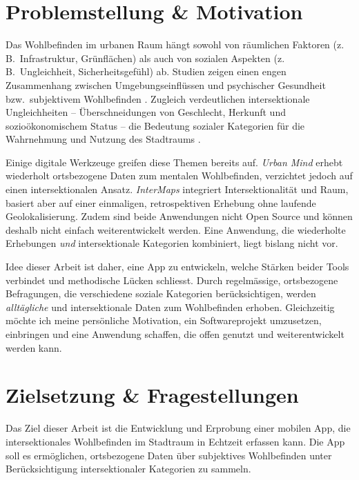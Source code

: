 \documentclass{template}
\begin{document}
\maketitle

\section{Problemstellung \& Motivation}
Das Wohlbefinden im urbanen Raum hängt sowohl von räumlichen Faktoren (z.\,B.\ Infrastruktur, Grünflächen) als auch von sozialen Aspekten (z.\,B.\ Ungleichheit, Sicherheitsgefühl) ab. Studien zeigen einen engen Zusammenhang zwischen Umgebungseinflüssen und psychischer Gesundheit bzw.\ subjektivem Wohlbefinden \parencite{kan_impacts_2022, hammoud_smartphone-based_2024, bergou_mental_2022}. Zugleich verdeutlichen intersektionale Ungleichheiten – Überschneidungen von Geschlecht, Herkunft und sozioökonomischem Status – die Bedeutung sozialer Kategorien für die Wahrnehmung und Nutzung des Stadtraums \parencite{webster_centering_2021, rodo-de-zarate_developing_2014, beebeejaun_race_2022}.

Einige digitale Werkzeuge greifen diese Themen bereits auf. \emph{Urban Mind} \parencite{bakolis_urban_2018} erhebt wiederholt ortsbezogene Daten zum mentalen Wohlbefinden, verzichtet jedoch auf einen intersektionalen Ansatz. \emph{InterMaps} \parencite{rodo-de-zarate_developing_2014} integriert Intersektionalität und Raum, basiert aber auf einer einmaligen, retrospektiven Erhebung ohne laufende Geolokalisierung. Zudem sind beide Anwendungen nicht Open Source und können deshalb nicht einfach weiterentwickelt werden. Eine Anwendung, die wiederholte Erhebungen \emph{und} intersektionale Kategorien kombiniert, liegt bislang nicht vor.

Idee dieser Arbeit ist daher, eine App zu entwickeln, welche Stärken beider Tools verbindet und methodische Lücken schliesst. Durch regelmässige, ortsbezogene Befragungen, die verschiedene soziale Kategorien berücksichtigen, werden \emph{alltägliche} und intersektionale Daten zum Wohlbefinden erhoben. Gleichzeitig möchte ich meine persönliche Motivation, ein Softwareprojekt umzusetzen, einbringen und eine Anwendung schaffen, die offen genutzt und weiterentwickelt werden kann.



\section{Zielsetzung \& Fragestellungen}
Das Ziel dieser Arbeit ist die Entwicklung und Erprobung einer mobilen App, die intersektionales Wohlbefinden im Stadtraum in Echtzeit erfassen kann. Die App soll es ermöglichen, ortsbezogene Daten über subjektives Wohlbefinden unter Berücksichtigung intersektionaler Kategorien zu sammeln.
\end{document}

